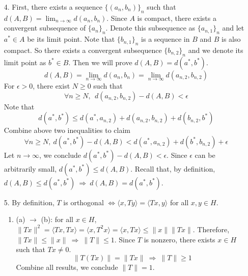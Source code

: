 \begin{itemize}
	\item[4.] First, there exists a sequence $\{(a_n, b_n)\}_n$ such that $d(A,B) = \lim_{n\rightarrow\infty}d(a_n,b_n)$. Since $A$ is compact, there exists a convergent subsequence of $\{a_n\}_n$. Denote this subsequence as $\{a_{n,1}\}_n$ and let $a^*\in A$ be its limit point. Note that $\{b_{n,1}\}_n$ is a sequence in $B$ and $B$ is also compact. So there exists a convergent subsequence $\{b_{n,2}\}_n$ and we denote its limit point as $b^*\in B$. Then we will prove $d(A,B) = d(a^*, b^*)$.  
	$$
	d(A,B) = \lim_{n\rightarrow\infty} d(a_n, b_n) = \lim_{n\rightarrow\infty} d\left(a_{n,2}, b_{n,2} \right)
	$$
	For $\epsilon >0$, there exist $N\ge0$ such that
	$$
	\forall n\ge N,~~d(a_{n,2}, b_{n,2}) - d(A,B) < \epsilon
	$$
	Note that
	$$
	d(a^*,b^*)\le d(a^*, a_{n,2}) + d(a_{n,2},b_{n,2}) + d(b_{n,2},b^*)
	$$
	Combine above two inequalities to claim
	$$
	\forall n\ge  N, ~d(a^*,b^*)-d(A,B) < d(a^*, a_{n,2}) + d(b^*, b_{n,2})  +\epsilon
	$$
	Let $n\rightarrow \infty$, we conclude $ d(a^*,b^*)-d(A,B) <\epsilon$. 
	Since $\epsilon$ can be arbitrarily small, $d(a^*,b^*)\le d(A,B)$. Recall that, by definition, $d(A,B)\le d(a^*,b^*) ~\Rightarrow~ d(A,B)=d(a^*,b^*)$.
	
	\item[5.] 
	 By definition, $T$ is orthogonal $\Leftrightarrow \langle x, Ty\rangle = \langle Tx, y\rangle$ for all $x,y\in H$.
	\begin{enumerate}[$\bullet$]
		\item (a) $\rightarrow$ (b): for all $x\in H$, $\lVert Tx\rVert^2 = \langle Tx, Tx\rangle = \langle x, T^2x\rangle = \langle x, Tx\rangle \le \lVert x\rVert \lVert Tx\rVert$. Therefore, $\lVert Tx\rVert \le \lVert x\rVert ~\Rightarrow~ \lVert T\rVert \le 1$. Since $T$ is nonzero, there exists $x\in H$ such that $Tx\neq 0$. 
		$$
		\lVert T(Tx)\rVert = \lVert Tx\rVert ~\Rightarrow~ \lVert T\rVert \ge 1 
		$$
		Combine all results, we conclude $\lVert T\rVert = 1$.
		

\end{enumerate}
\end{itemize}
